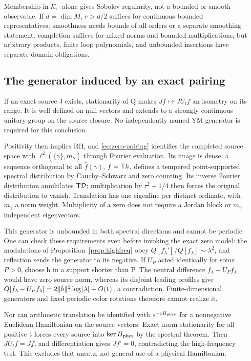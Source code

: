 Membership in $\mathcal K_r$ alone gives Sobolev regularity,
not a bounded or smooth observable. If $d=\dim M$,
$r>d/2$ suffices for continuous bounded representatives;
smoothness needs bounds of all orders or a separate
smoothing statement. \Ltwo{} completion suffices for mixed
norms and bounded multiplications, but arbitrary products,
finite loop polynomials, and unbounded insertions have
separate domain obligations.

\subsection{The generator induced by an exact pairing}
If an exact source J exists, stationarity of Q makes
$Jf\mapsto JU_tf$ an isometry on its range. It is
well defined on null vectors and extends to a strongly
continuous unitary group on the source closure.
No independently named YM generator is required for
this conclusion.

Positivity then implies RH, and \eqref{eq:zero-pairing}
identifies the completed source space with
$\ell^2(\{\gamma\},m_\gamma)$ through Fourier evaluation.
Its image is dense: a sequence orthogonal to all
$\widehat f(\gamma)$, $f=\mathsf T h$, defines a tempered
point-supported spectral distribution by Cauchy--Schwarz
and zero counting. Its inverse Fourier distribution
annihilates $\mathsf T\mathcal D$; multiplication by
$\tau^2+1/4$ then forces the original distribution
to vanish. Translation has one eigenline per
distinct ordinate, with $m_\gamma$ a norm weight.
Multiplicity of a zero does not require a Jordan
block or $m_\gamma$ independent eigenvectors.

This generator is unbounded in both spectral
directions and cannot be periodic. One can check
these requirements even before invoking the exact
zero model: the modulations of
Proposition~\ref{prop:highfreq} obey
$Q[f_\lambda']/Q[f_\lambda]\sim\lambda^2$,
and reflection sends the generator to its negative.
If $U_P$ acted identically for some $P>0$, choose h
in a support shorter than P. The neutral difference
$f_\lambda-U_Pf_\lambda$ would have zero source norm,
whereas its disjoint leading profiles give
$Q[f_\lambda-U_Pf_\lambda]
=2\lVert h\rVert^2\log|\lambda|+O(1)$, a contradiction.
Finite-dimensional generators and fixed periodic
color rotations therefore cannot realize it.

Nor can arithmetic translation be identified with
$e^{-tH_{\rm phys}}$ for a nonnegative Euclidean
Hamiltonian on the source vectors. Exact norm
stationarity for all positive t forces every source
into $\ker H_{\rm phys}$ by the spectral theorem.
Then $JU_tf=Jf$, and differentiation gives $Jf'=0$,
contradicting the high-frequency test. This excludes
that ansatz, not general use of a physical Hamiltonian.

